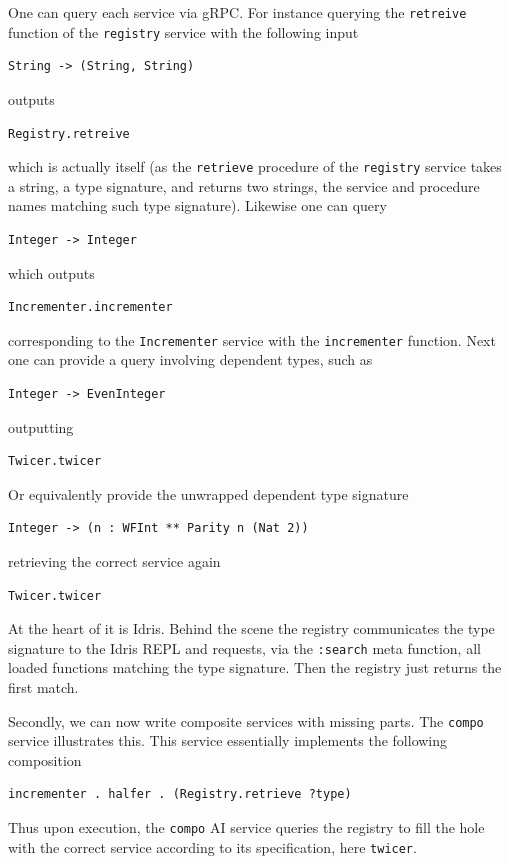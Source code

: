 \documentclass[]{report}
\begin{document}
One can query each service via gRPC.  For instance querying the
\texttt{retreive} function of the \texttt{registry} service with the
following input
\begin{verbatim}
String -> (String, String)
\end{verbatim}
outputs
\begin{verbatim}
Registry.retreive
\end{verbatim}
which is actually itself (as the \texttt{retrieve} procedure of the
\texttt{registry} service takes a string, a type signature, and
returns two strings, the service and procedure names matching such
type signature).  Likewise one can query
\begin{verbatim}
Integer -> Integer
\end{verbatim}
which outputs
\begin{verbatim}
Incrementer.incrementer
\end{verbatim}
corresponding to the \texttt{Incrementer} service with the
\texttt{incrementer} function.
Next one can provide a query involving dependent types, such as
\begin{verbatim}
Integer -> EvenInteger
\end{verbatim}
outputting
\begin{verbatim}
Twicer.twicer
\end{verbatim}
Or equivalently provide the unwrapped dependent type signature
\begin{verbatim}
Integer -> (n : WFInt ** Parity n (Nat 2))
\end{verbatim}
retrieving the correct service again
\begin{verbatim}
Twicer.twicer
\end{verbatim}

At the heart of it is Idris.  Behind the scene the registry
communicates the type signature to the Idris REPL and requests, via
the \texttt{:search} meta function, all loaded functions matching the
type signature.  Then the registry just returns the first match.

Secondly, we can now write composite services with missing parts.  The
\texttt{compo} service illustrates this.  This service essentially
implements the following composition
\begin{verbatim}
incrementer . halfer . (Registry.retrieve ?type)
\end{verbatim}
Thus upon execution, the \texttt{compo} AI service queries the
registry to fill the hole with the correct service according to its
specification, here \texttt{twicer}.
\end{document}
